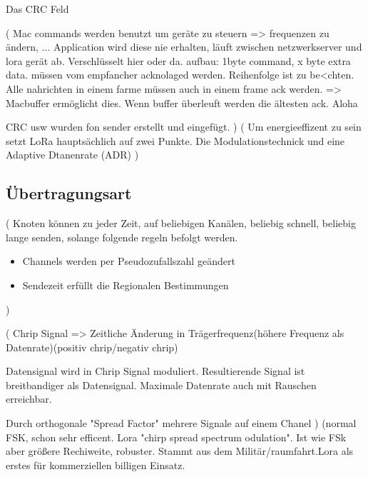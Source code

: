\documentclass[a4paper,12pt]{article}
\begin{document}
            Das CRC Feld 
            
            \cite{LoRaSpec}(
                Mac commands werden benutzt um geräte zu steuern => frequenzen zu ändern, ...
                Application wird diese nie erhalten, läuft zwischen netzwerkserver und lora gerät ab.
                Verschlüsselt hier oder da.
                aufbau: 1byte command, x byte extra data.
                müssen vom empfancher acknolaged werden. Reihenfolge ist zu be<chten. Alle nahrichten in einem farme müssen auch in einem frame ack werden. => Macbuffer ermöglicht dies. Wenn buffer überleuft werden die ältesten ack. 
                Aloha

                CRC usw wurden fon sender erstellt und eingefügt.
            )
            \cite{LoraClasses}(
                Um energieeffizent zu sein setzt LoRa hauptsächlich auf zwei Punkte. Die Modulationstechnick und eine Adaptive Dtanenrate (ADR)
            )
        \subsection{Übertragungsart}\label{sec:Modulation}
            \cite{LoRaSpec}(
                Knoten können zu jeder Zeit, auf beliebigen Kanälen, beliebig schnell, beliebig lange senden, solange folgende regeln befolgt werden.
                \begin{itemize}
                    
                        \item Channels werden per Pseudozufallszahl geändert
                        \item Sendezeit erfüllt die Regionalen Bestimmungen
                    
                \end{itemize}
            )

            \cite{LoraLimit}(
                Chrip Signal => Zeitliche Änderung in Trägerfrequenz(höhere Frequenz als Datenrate)(positiv chrip/negativ chrip)

                Datensignal wird in Chrip Signal moduliert. Resultierende Signal ist breitbandiger als Datensignal. Maximale Datenrate auch mit Rauschen erreichbar.

                Durch orthogonale "Spread Factor" mehrere Signale auf einem Chanel
            )
            \cite{WhatIsLoRa}(normal FSK, schon sehr efficent. Lora "chirp spread spectrum odulation". Ist wie FSk aber größere Rechiweite, robuster. Stammt aus dem Militär/raumfahrt.Lora als erstes für kommerziellen billigen Einsatz.
            
\end{document}

